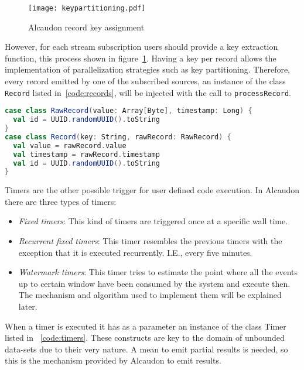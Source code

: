 \begin{figure}
  \begin{center}
    \texttt{[image: keypartitioning.pdf]}
    \caption{Alcaudon record key assignment}
    \label{fig:keypartitioning}
  \end{center}
\end{figure}

However, for each stream subscription users should provide a key extraction
function, this process shown in figure~\ref{fig:keypartitioning}. Having a key
per record allows the implementation of parallelization strategies such as key
partitioning. Therefore, every record emitted by one of the subscribed sources,
an instance of the class \lstinline[columns=fixed]{Record} listed
in~\ref{code:records}, will be injected with the call to
\lstinline[columns=fixed]{processRecord}.

\begin{lstlisting}[language=scala, frame=trBL, label=code:records, float=ht, caption = {Record classes}]
case class RawRecord(value: Array[Byte], timestamp: Long) {
  val id = UUID.randomUUID().toString
}
case class Record(key: String, rawRecord: RawRecord) {
  val value = rawRecord.value
  val timestamp = rawRecord.timestamp
  val id = UUID.randomUUID().toString
}
\end{lstlisting}

Timers are the other possible trigger for user defined code execution. In
Alcaudon there are three types of timers:

\begin{itemize}
\item \textit{Fixed timers}: This kind of timers are triggered once at a
  specific wall time.
\item \textit{Recurrent fixed timers}: This timer resembles the previous timers
  with the exception that it is executed recurrently. I.E., every five minutes.
\item \textit{Watermark timers}: This timer tries to estimate the point where all
  the events up to certain window have been consumed by the system and execute
  then. The mechanism and algorithm used to implement them will be explained
  later.
\end{itemize}

When a timer is executed it has as a parameter an instance of the class Timer
listed in ~\ref{code:timers}. These constructs are key to the domain of unbounded
data-sets due to their very nature. A mean to emit partial results is needed, so
this is the mechanism provided by Alcaudon to emit results.

